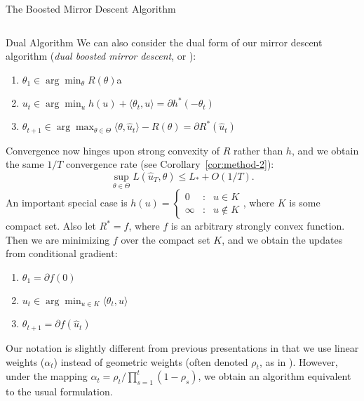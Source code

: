 \documentclass[final]{beamer}
\begin{document}
\begin{frame}{}
\begin{columns}
\begin{column}{0.48\linewidth}
\begin{block}{\large The Boosted Mirror Descent Algorithm}
\begin{columns}[t]
\begin{column}{0.45\linewidth}
\begin{block}{Dual Algorithm}
We can also consider the dual form of our mirror descent algorithm 
({\em dual boosted mirror descent}, or \dual):
\begin{enumerate}
\item $\theta_1 \in \arg\min_{\theta} R(\theta)$a
\item $u_t \in \arg\min_{u} h(u) + \langle \theta_t, u \rangle = \partial h^{*}(-\theta_{t})$
\item $\theta_{t+1} \in \arg\max_{\theta \in \Theta} \langle \theta, \hat{u}_t \rangle - R(\theta) = \partial R^{*}(\hat u_{t})$
\end{enumerate}
Convergence now hinges upon strong convexity of $R$ rather than 
$h$, and we obtain the same $1/T$ convergence 
rate (see Corollary~\ref{cor:method-2}):
\[ \sup_{\theta \in \Theta} L(\hat{u}_T, \theta) \leq L_{*} + O(1/T). \]
An important special case is $h(u) = \left\{ \begin{array}{ccl} 0 & : & u \in K \\ \infty & : & u \not\in K \end{array} \right.$, where $K$ is some 
compact set. Also let $R^* = f$, where $f$ is an arbitrary strongly convex 
function. Then we are minimizing $f$ over the compact set $K$, and we obtain 
the updates from conditional gradient:
\begin{enumerate}
\item $\theta_1 = \partial f(0)$
\item $u_t \in \arg\min_{u \in K} \langle \theta_t, u \rangle$
\item $\theta_{t+1} = \partial f(\hat{u}_t)$
\end{enumerate}
Our notation is slightly different from previous presentations in 
that we use linear weights ($\alpha_t$) instead of geometric weights 
(often denoted $\rho_t$, as in \cite{Bach:2012b}). However, under the 
mapping $\alpha_t = \rho_t/\prod_{s=1}^t (1-\rho_s)$, we obtain an 
algorithm equivalent to the usual formulation.
\end{block}
	
\end{column}
\end{columns}
\end{block}
\end{column}		


\end{columns}
\end{frame}
\end{document}

